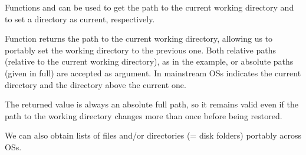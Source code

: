 \documentclass[krantz2]{krantz}\usepackage{knitr}%
\begin{document}
Functions  and  can be used to get the path to the current working directory and to set a directory as current, respectively.

\begin{knitrout}\footnotesize
{}\color{fgcolor}\begin{kframe}
\begin{alltt}
\hlstd{()}
\end{alltt}
\end{kframe}
\end{knitrout}

Function  returns the path to the current working directory, allowing us to portably set the working directory to the previous one. Both relative paths (relative to the current working directory), as in the example, or absolute paths (given in full) are accepted as argument. In mainstream OSs  indicates the current directory and  the directory above the current one.

\begin{knitrout}\footnotesize
{}\color{fgcolor}\begin{kframe}
\begin{alltt}
 \hlkwb{<-} \hlstd{(}\hlstd{)}
\hlstd{()}
\end{alltt}
\end{kframe}
\end{knitrout}

The returned value is always an absolute full path, so it remains valid even if the path to the working directory changes more than once before being restored.

\begin{knitrout}\footnotesize
{}\color{fgcolor}\begin{kframe}
\begin{alltt}
\hlstd{()}
\end{alltt}
\end{kframe}
\end{knitrout}

We can also obtain lists of files and/or directories (= disk folders) portably across OSs.
\end{document}
